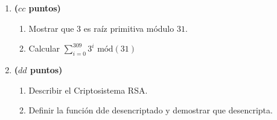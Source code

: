 \documentclass{article}
\theoremstyle{definition}
\begin{document}
\begin{enumerate}
\vspace{0.2cm}

\item
\textbf{($cc$ puntos)}
\begin{enumerate}
  \item Mostrar que $3$ es ra\'iz primitiva m\'odulo $31$.
  \item Calcular $\displaystyle \sum_{i=0}^{309} 3^{i} \mbox{ m\'od} (31)$
\end{enumerate}

\item
\textbf{($dd$ puntos)}
\begin{enumerate}
\item Describir el Criptosistema RSA.
\item Definir la funci\'on dde desencriptado y demostrar que desencripta.

\end{enumerate}

\end{enumerate}
\end{document}
